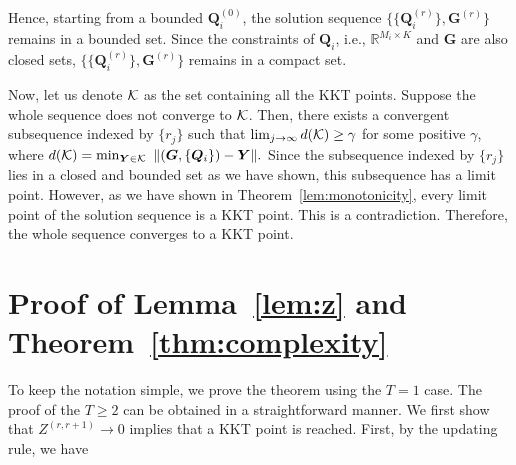\documentclass[10pt,journal]{IEEEtran}
\begin{document}
Hence, starting from a bounded ${\bm Q}_i^{(0)}$, the solution sequence $\{\{{\bm Q}_i^{(r)}\},{\bm G}^{(r)}\}$ remains in a bounded set. Since the constraints of ${\bm Q}_i$, i.e., $\mathbb{R}^{M_i\times K}$ and ${\bm G}$ are also closed sets,  $\{\{{\bm Q}_i^{(r)}\},{\bm G}^{(r)}\}$ remains in a compact set.

Now, let us denote ${\cal K}$ as the set containing all the KKT points.
Suppose the whole sequence does not converge to ${\cal K}$.
Then, there exists a convergent subsequence indexed by $\{r_j\}$ such that
$\lim_{j\rightarrow \infty} d({\cal K})\geq \gamma$
for some positive $\gamma$, where
$d({\cal K}) = \min_{{\bm Y}\in{\cal K}}~\|({\bm G},\{{\bm Q}_i\}) - {\bm Y}\|.$
Since the subsequence indexed by $\{r_j\}$ lies in a closed and bounded set as we have shown,
this subsequence has a limit point.
However, as we have shown in Theorem~\ref{lem:monotonicity}, every limit point of the solution sequence is a KKT point.
This is a contradiction.
Therefore, the whole sequence converges to a KKT point.

\section{Proof of Lemma~\ref{lem:z} and Theorem~\ref{thm:complexity}}\label{app:complexity}

To keep the notation simple, we prove the theorem using the $T=1$ case.
The proof of the $T\geq 2$ can be obtained in a straightforward manner. 
We first show that $Z^{(r,r+1)}\rightarrow 0$ implies that a KKT point is reached.
First, by the updating rule, we have
\end{document}
